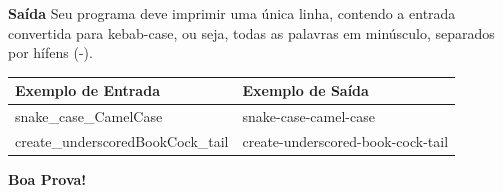 \documentclass[a4paper, 12pt]{article}
\begin{document}
\textbf{{\large Saída}} \newline
Seu programa deve imprimir uma única linha, contendo a entrada convertida para
kebab-case, ou seja, todas as palavras em minúsculo, separados por hífens (-).
\newline
\begin{table}[H]
\centering
\begin{tabular}{|l|l|}
\hline
\textbf{Exemplo de Entrada}       & \textbf{Exemplo de Saída}         \\ \hline
snake\_case\_CamelCase            & snake-case-camel-case             \\ \hline
create\_underscoredBookCock\_tail & create-underscored-book-cock-tail \\ \hline
\end{tabular}
\end{table}
\flushright
\textbf{\Large Boa Prova!}
\end{document}
